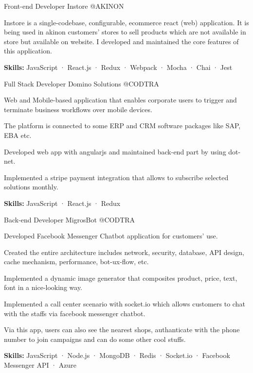 \begin{cventries}
  \cventry
    {Front-end Developer} %
    {Instore} %
    {@AKINON} %
    {}
    {
      \begin{cvitems} %
        \item {Instore is a single-codebase, configurable, ecommerce react (web) application. It is being used in akinon customers' stores to sell products which are not available in store but available on website. I developed and maintained the core features of this application.}
        \item {\textbf {Skills:} JavaScript · React.js · Redux · Webpack · Mocha · Chai · Jest}
      \end{cvitems}
    }

  \cventry
    {Full Stack Developer} %
    {Domino Solutions} %
    {@CODTRA} %
    {}
    {
      \begin{cvitems} %
        \item {Web and Mobile-based application that enables corporate users to trigger and terminate business workflows over mobile devices.}
        \item {The platform is connected to some ERP and CRM software packages like SAP, EBA etc.}
        \item {Developed web app with angularjs and maintained back-end part by using dot-net.}
        \item {Implemented a stripe payment integration that allows to subscribe selected solutions monthly.}
        \item {\textbf {Skills:} JavaScript · React.js · Redux}
      \end{cvitems}
    }

  \cventry
    {Back-end Developer} %
    {MigrosBot} %
    {@CODTRA} %
    {}
    {
      \begin{cvitems} %
        \item {Developed Facebook Messenger Chatbot application for customers' use.}
        \item {Created the entire architecture includes network, security, database, API design, cache mechanism, performance, bot-ux-flow, etc.}
        \item {Implemented a dynamic image generator that composites product, price, text, font in a nice-looking way.}
        \item {Implemented a call center scenario with socket.io which allows customers to chat with the staffs via facebook messenger chatbot.}
        \item {Via this app, users can also see the nearest shops, authanticate with the phone number to join campaigns and can do some other cool stuffs.}
        \item {\textbf {Skills:} JavaScript · Node.js · MongoDB · Redis · Socket.io · Facebook Messenger API · Azure}
      \end{cvitems}
    }


\end{cventries}
